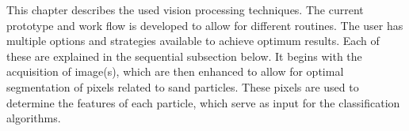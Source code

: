This chapter describes the used vision processing techniques. The current prototype and work flow is developed to allow for different routines. The user has multiple options and strategies available to achieve optimum results. Each of these are explained in the sequential subsection below. It begins with the acquisition of image(s), which are then enhanced to allow for optimal segmentation of pixels related to sand particles. These pixels are used to determine the features of each particle, which serve as input for the classification algorithms.